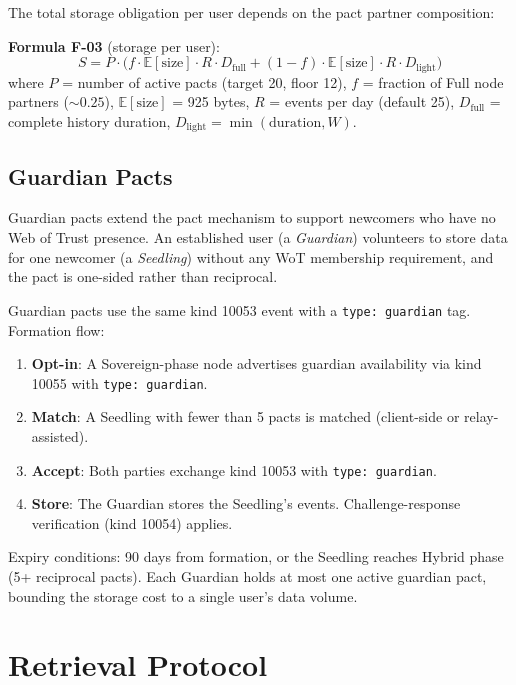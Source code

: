 \documentclass[11pt,a4paper]{article}
\begin{document}
The total storage obligation per user depends on the pact partner composition:

\textbf{Formula F-03} (storage per user):
\begin{equation}
  S = P \cdot \bigl(f \cdot \mathbb{E}[\text{size}] \cdot R \cdot D_{\text{full}} + (1-f) \cdot \mathbb{E}[\text{size}] \cdot R \cdot D_{\text{light}}\bigr)
\end{equation}
where $P$ = number of active pacts (target 20, floor 12), $f$ = fraction of Full node partners (${\sim}0.25$), $\mathbb{E}[\text{size}]$ = 925 bytes, $R$ = events per day (default 25), $D_{\text{full}}$ = complete history duration, $D_{\text{light}} = \min(\text{duration}, W)$.

\subsection{Guardian Pacts}

Guardian pacts extend the pact mechanism to support newcomers who have no Web of Trust presence. An established user (a \emph{Guardian}) volunteers to store data for one newcomer (a \emph{Seedling}) without any WoT membership requirement, and the pact is one-sided rather than reciprocal.

Guardian pacts use the same kind 10053 event with a \texttt{type: guardian} tag. Formation flow:

\begin{enumerate}
  \item \textbf{Opt-in}: A Sovereign-phase node advertises guardian availability via kind 10055 with \texttt{type: guardian}.
  \item \textbf{Match}: A Seedling with fewer than 5 pacts is matched (client-side or relay-assisted).
  \item \textbf{Accept}: Both parties exchange kind 10053 with \texttt{type: guardian}.
  \item \textbf{Store}: The Guardian stores the Seedling's events. Challenge-response verification (kind 10054) applies.
\end{enumerate}

Expiry conditions: 90 days from formation, or the Seedling reaches Hybrid phase (5+ reciprocal pacts). Each Guardian holds at most one active guardian pact, bounding the storage cost to a single user's data volume.

\section{Retrieval Protocol}
\label{sec:retrieval}
\end{document}
